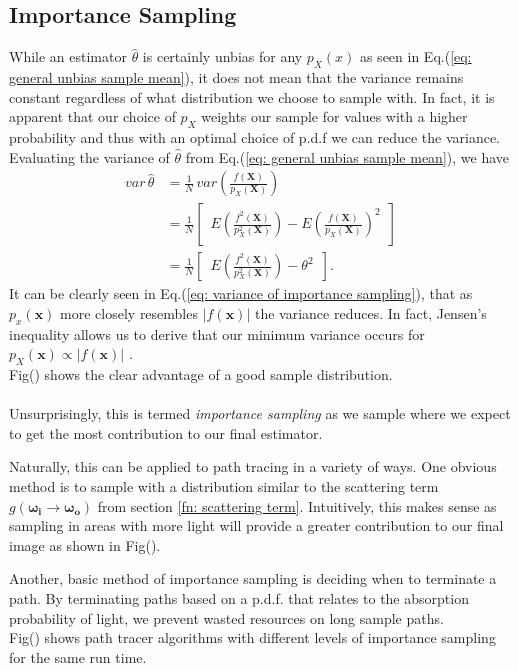 \documentclass{article}
\begin{document}
\subsection{Importance Sampling}
While an estimator $\hat{\theta}$ is certainly unbias for any $p_X(x)$ as seen in 
Eq.(\ref{eq: general unbias sample mean}), it does not mean that the variance remains constant
regardless of what distribution we choose to sample with. 
In fact, it is apparent that our choice of $p_X$ weights our sample for values with a higher 
probability and thus with an optimal choice of p.d.f we can reduce the variance.
\\
Evaluating the variance of $\hat{\theta}$ from Eq.(\ref{eq: general unbias sample mean}), we have
\begin{align}
    var\,\hat{\theta} &= \frac{1}{N}\, var \left( \frac{f(\boldsymbol{X})}{p_X(\boldsymbol{X})} \right) \\
    &=\frac{1}{N} \left[ \,\,\, E \left( \frac{f^{2}(\boldsymbol{X})}{p_{X}^{2}(\boldsymbol{X})} 
    \right) - E\left( \frac{f(\boldsymbol{X})}{p_{X}(\boldsymbol{X})} \right)^{2} \,\,\, \right]\\
    &=\frac{1}{N} \left[ \,\,\, E \left( \frac{f^{2}(\boldsymbol{X})}{p_{X}^{2}(\boldsymbol{X})} 
    \right) - \theta^{2}\,\,\, \right].\label{eq: variance of importance sampling}
\end{align}
It can be clearly seen in Eq.(\ref{eq: variance of importance sampling}), that as $p_x(\boldsymbol{x})$
more closely resembles $|f(\boldsymbol{x})|$ the variance reduces. 
In fact, Jensen's inequality allows us to derive that our minimum variance occurs for 
$p_X(\boldsymbol{x}) \propto |f(\boldsymbol{x})|$ \cite{gentle2003random}.
\\
Fig() shows the clear advantage of a good sample distribution. 
\\
\\
Unsurprisingly, this is termed \textit{importance sampling} as we sample where we expect to get the most 
contribution to our final estimator.

Naturally, this can be applied to path tracing in a variety of ways. 
One obvious method is to sample with a distribution similar to the scattering term
$g(\boldsymbol{\omega_i}\rightarrow\boldsymbol{\omega_o})$ from section \ref{fn: scattering term}. 
Intuitively, this makes sense as sampling in areas with more light will provide a greater contribution 
to our final image as shown in Fig().

Another, basic method of importance sampling is deciding when to terminate a path. 
By terminating paths based on a p.d.f. that relates to the absorption probability of light,
we prevent wasted resources on long sample paths.
\\
Fig() shows path tracer algorithms with different levels of importance sampling for the same run time.
\end{document}

